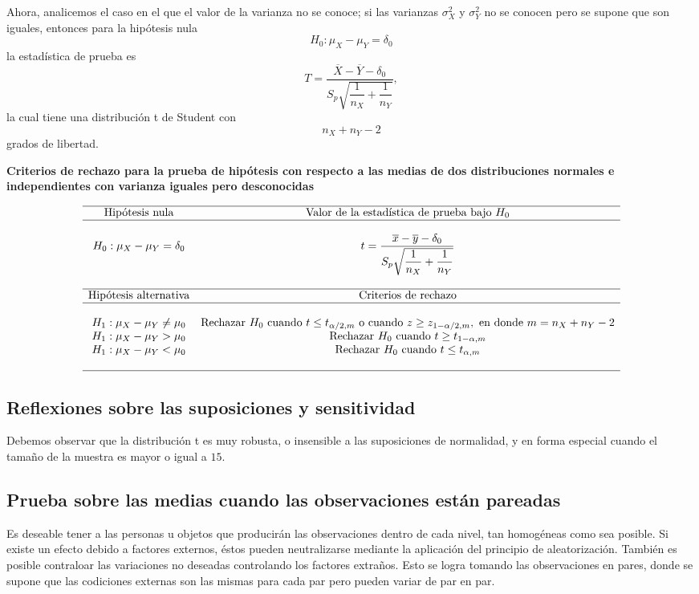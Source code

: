 Ahora, analicemos el caso en el que el valor de la varianza no se conoce; si las varianzas $\sigma_X^2$ y $\sigma_Y^2$ no se conocen pero se supone que son iguales, entonces para la hipótesis nula
$$H_0:\mu_X-\mu_Y=\delta_0$$
la estadística de prueba es
$$T=\dfrac{\overline{X}-\overline{Y}-\delta_0}{S_p\sqrt{\dfrac{1}{n_X}+\dfrac{1}{n_Y}}},$$
la cual tiene una distribución t de Student con $$n_X+n_Y-2$$ grados de libertad. 

\begin{center}
\textbf{Criterios de rechazo para la prueba de hipótesis con respecto a las medias de dos distribuciones normales e independientes con varianza iguales pero desconocidas}
\end{center}
$$
\begin{array}{cc}
    \hline
    \mbox{Hipótesis nula} & \mbox{Valor de la estadística de prueba bajo } H_0\\
    \hline\\
    H_0: \mu_X-\mu_Y=\delta_0 & t=\dfrac{\overline{x}-\overline{y}-\delta_0}{S_p \sqrt{\dfrac{1}{n_X}+\dfrac{1}{n_Y}}}\\\\
    \hline
    \mbox{Hipótesis alternativa} & \mbox{Criterios de rechazo}\\
    \hline\\
    H_1:\mu_X-\mu_Y\neq \mu_0 & \mbox{Rechazar } H_0 \mbox{ cuando } t\leq t_{\alpha/2,m} \mbox{ o cuando } z\geq z_{1-\alpha/2,m}, \mbox{ en donde } m=n_X+n_Y-2\\
    H_1:\mu_X-\mu_Y> \mu_0 & \mbox{Rechazar } H_0 \mbox{ cuando } t\geq t_{1-\alpha,m}\\
    H_1:\mu_X-\mu_Y< \mu_0 & \mbox{Rechazar } H_0 \mbox{ cuando } t\leq t_{\alpha,m}\\\\
    \hline
\end{array}
$$

\subsection{Reflexiones sobre las suposiciones y sensitividad}
Debemos observar que la distribución t es muy robusta, o insensible a las suposiciones de normalidad, y en forma especial cuando el tamaño de la muestra es mayor o igual a $15$.

\subsection{Prueba sobre las medias cuando las observaciones están pareadas}
Es deseable tener a las personas u objetos que producirán las observaciones dentro de cada nivel, tan homogéneas como sea posible. Si existe un efecto debido a factores externos, éstos pueden neutralizarse mediante la aplicación del principio de aleatorización. También es posible contraloar las variaciones no deseadas controlando los factores extraños. Esto se logra tomando las observaciones en pares, donde se supone que las codiciones externas son las mismas para cada par pero pueden variar de par en par. 


